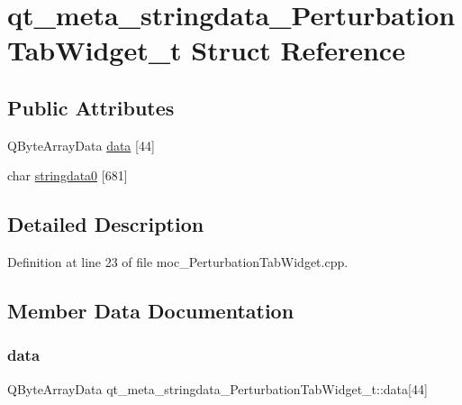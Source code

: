 \hypertarget{structqt__meta__stringdata___perturbation_tab_widget__t}{}\section{qt\+\_\+meta\+\_\+stringdata\+\_\+\+Perturbation\+Tab\+Widget\+\_\+t Struct Reference}
\label{structqt__meta__stringdata___perturbation_tab_widget__t}
\subsection*{Public Attributes}
\begin{DoxyCompactItemize}
\item 
Q\+Byte\+Array\+Data \hyperlink{structqt__meta__stringdata___perturbation_tab_widget__t_a7c012ee25d279aeff1c394f8feb63582}{data} \mbox{[}44\mbox{]}
\item 
char \hyperlink{structqt__meta__stringdata___perturbation_tab_widget__t_a6e2e7d99d25072f057d379f75a2c46c3}{stringdata0} \mbox{[}681\mbox{]}
\end{DoxyCompactItemize}


\subsection{Detailed Description}


Definition at line 23 of file moc\+\_\+\+Perturbation\+Tab\+Widget.\+cpp.



\subsection{Member Data Documentation}
\mbox{\label{structqt__meta__stringdata___perturbation_tab_widget__t_a7c012ee25d279aeff1c394f8feb63582}} 
\subsubsection{\texorpdfstring{data}{data}}
{\footnotesize\ttfamily Q\+Byte\+Array\+Data qt\+\_\+meta\+\_\+stringdata\+\_\+\+Perturbation\+Tab\+Widget\+\_\+t\+::data\mbox{[}44\mbox{]}}



